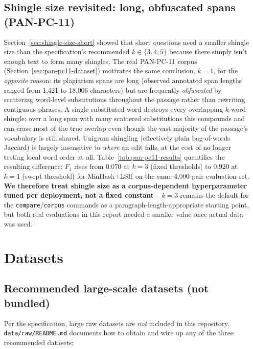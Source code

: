 \documentclass[11pt]{article}
\begin{document}
\subsection{Shingle size revisited: long, obfuscated spans (PAN-PC-11)}
\label{sec:shingle-size-pan}

Section~\ref{sec:shingle-size-short} showed that short questions need a smaller shingle size than the specification's
recommended $k \in \{3,4,5\}$ because there simply isn't enough text to form many shingles. The real
PAN-PC-11 corpus (Section~\ref{sec:pan-pc11-dataset}) motivates the same conclusion, $k=1$, for the
\emph{opposite} reason: its plagiarism spans are long (observed annotated span lengths ranged from 1{,}421
to 18{,}006 characters) but are frequently \emph{obfuscated} by scattering word-level substitutions
throughout the passage rather than rewriting contiguous phrases. A single substituted word destroys every
overlapping $k$-word shingle; over a long span with many scattered substitutions this compounds and can
erase most of the true overlap even though the vast majority of the passage's vocabulary is still shared.
Unigram shingling (effectively plain bag-of-words Jaccard) is largely insensitive to \emph{where} an edit
falls, at the cost of no longer testing local word order at all. Table~\ref{tab:pan-pc11-results} quantifies
the resulting difference: $F_1$ rises from $0.070$ at $k=3$ (fixed thresholds) to $0.920$ at $k=1$ (swept
threshold) for MinHash+LSH on the same 4{,}000-pair evaluation set. \textbf{We therefore treat shingle size
as a corpus-dependent hyperparameter tuned per deployment, not a fixed constant} -- $k=3$ remains the
default for the \texttt{compare}/\texttt{corpus} commands as a paragraph-length-appropriate starting point,
but both real evaluations in this report needed a smaller value once actual data was used.

\section{Datasets}
\label{sec:pairs-dataset}

\subsection{Recommended large-scale datasets (not bundled)}

Per the specification, large raw datasets are \emph{not} included in this repository. \verb|data/raw/README.md|
documents how to obtain and wire up any of the three recommended datasets:
\end{document}
